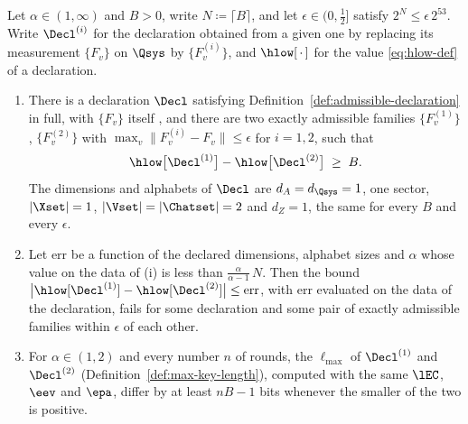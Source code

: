 \begin{proposition}\label{prop:optol-nobound}
Let $\alpha\in(1,\infty)$ and $B>0$, write $N\coloneqq\lceil B\rceil$, and
let $\epsilon\in(0,\tfrac12]$ satisfy $2^{N}\le\epsilon\,2^{53}$.
Write $\Decl^{(i)}$ for the declaration obtained from a given one by
replacing its measurement $\{F_v\}$ on $\Qsys$ by $\{F^{(i)}_v\}$, and
$\hlow[\,\cdot\,]$ for the value \eqref{eq:hlow-def} of a declaration.
\begin{enumerate}[label=(\roman*),leftmargin=2.4em]
\item There is a declaration $\Decl$ satisfying Definition~\ref{def:admissible-declaration}
in full, with $\{F_v\}$ itself , and there are two
exactly admissible families $\{F^{(1)}_v\}$, $\{F^{(2)}_v\}$ with
$\max_{v}\|F^{(i)}_v-F_v\|\le\epsilon$ for $i=1,2$, such that
\begin{equation}\label{eq:optol-gap}
  \hlow\big[\Decl^{(1)}\big]-\hlow\big[\Decl^{(2)}\big]\;\ge\;B .
\end{equation}
The dimensions and alphabets of $\Decl$ are $d_A=d_{\Qsys}=1$, one
sector, $|\Xset|=1$, $|\Vset|=|\Chatset|=2$ and $d_Z=1$, the same for
every $B$ and every $\epsilon$.
\item Let $\mathrm{err}$ be a function of the declared dimensions,
alphabet sizes and $\alpha$ whose value on the data of (i) is less than
$\frac{\alpha}{\alpha-1}\,N$. Then the bound
$\big|\hlow[\Decl^{(1)}]-\hlow[\Decl^{(2)}]\big|\le\mathrm{err}$, with
$\mathrm{err}$ evaluated on the data of the declaration, fails for some
declaration and some pair of exactly admissible families within
$\epsilon$ of each other.
\item For $\alpha\in(1,2)$ and every number $n$ of rounds, the
 $\ell_{\max}$ of
$\Decl^{(1)}$ and $\Decl^{(2)}$
(Definition~\ref{def:max-key-length}), computed with the same $\lEC$, $\eev$ and
$\epa$, differ by at least $nB-1$ bits whenever the smaller of the two is
positive.
\end{enumerate}
\end{proposition}

